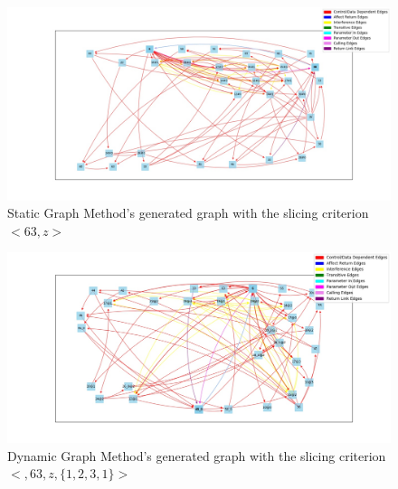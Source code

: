 \documentclass[conference]{IEEEtran}
\begin{document}
\begin{figure}[p]
    \centering
    \includegraphics[scale=0.5]{sourceSGz.jpeg}
    \caption{Static Graph Method's generated graph with the slicing criterion $<63,z>$}
    \label{fig:my_label}
\end{figure}
\begin{figure}[t]
    \centering
    \includegraphics[scale=0.5]{sourceDG.jpeg}
    \caption{Dynamic Graph Method's generated graph with the slicing criterion $<,63,z,\{1,2,3,1\}>$}
    \label{fig:my_label}
\end{figure}
\end{document}
